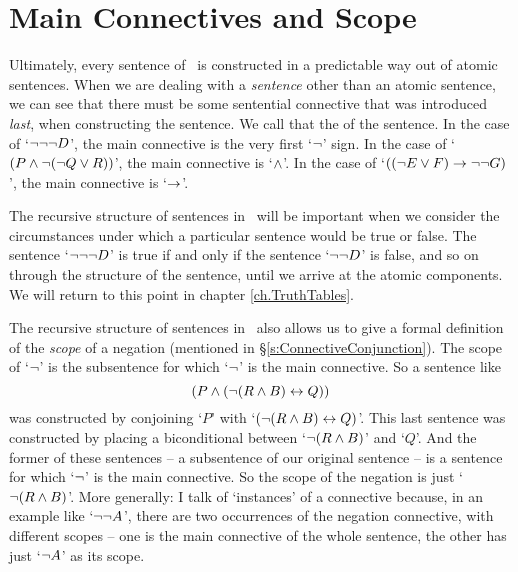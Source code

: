 \section{Main Connectives and Scope} \label{s.mainconnscope}

Ultimately, every sentence of \TFL\ is constructed in a predictable way out of atomic sentences. When we are dealing with a \emph{sentence} other than an atomic sentence, we can see that there must be some sentential connective that was introduced \emph{last}, when constructing the sentence. We call that the  of the sentence. In the case of `$\neg\neg\neg D$', the main connective is the very first `$\neg$' sign. In the case of `$(P \wedge \neg (\neg Q \vee R))$', the main connective is `$\wedge$'. In the case of `$((\neg E \vee F) \rightarrow \neg\neg G)$', the main connective is `$\rightarrow$'.

The recursive structure of sentences in \TFL\ will be important when we consider the circumstances under which a particular sentence would be true or false. The sentence `$\neg \neg \neg D$' is true if and only if the sentence `$\neg \neg D$' is false, and so on through the structure of the sentence, until we arrive at the atomic components. We will return to this point in chapter \ref{ch.TruthTables}.

The recursive structure of sentences in \TFL\ also allows us to give a formal definition of the \emph{scope} of a negation (mentioned in §\ref{s:ConnectiveConjunction}). The scope of `$\neg$' is the subsentence for which `$\neg$' is the main connective. So a sentence like $$(P \wedge (\neg (R \wedge B) \leftrightarrow Q))$$ was constructed by conjoining `$P$' with `$(\neg (R \wedge B) \leftrightarrow Q)$'. This last sentence was constructed by placing a biconditional between `$\neg (R \wedge B)$' and `$Q$'. And the former of these sentences – a subsentence of our original sentence – is a sentence for which `$\neg$' is the main connective. So the scope of the negation is just `$\neg(R \wedge B)$'. More generally:
 I talk of `instances' of a connective because, in an example like `$\neg\neg A$', there are two occurrences of the negation connective, with different scopes – one is the main connective of the whole sentence, the other has just `$\neg A$' as its scope.

